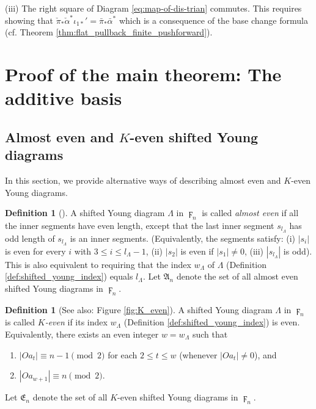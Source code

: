 \documentclass[a4paper]{amsart}
\theoremstyle{plain}
\theoremstyle{definition}
\newtheorem{definition}[theorem]{Definition}
\numberwithin{equation}{section}
\begin{document}
(iii) The right square of Diagram \ref{eq:map-of-dis-trian} commutes. This requires showing that $\check{\pi}_* \check{\alpha}^* \iota_{1*}' = \bar{\pi}_*\bar{\alpha}^*$ which is a consequence of the base change formula (cf. Theorem \ref{thm:flat_pullback_finite_pushforward}).


\section{Proof of the main theorem: The additive basis} \label{sec:proof_of_the_main_theorem}

\subsection{Almost even and \texorpdfstring{$K$}{K}-even shifted Young diagrams}
In this section, we provide alternative ways of describing almost even and $K$-even Young diagrams.
\begin{definition}[\cite{martirosian2021witt}]
    A shifted Young diagram $\Lambda$ in $\digamma_{n}$ is called \textit{almost even} if all the inner segments have even length, except that the last inner segment $s_{l_{\Lambda}}$ has odd length of $s_{l_{\Lambda}}$ is an inner segments. (Equivalently, the segments satisfy: (i) $|s_i|$ is even for every $i$ with $3 \leq i \leq l_\Lambda - 1$, (ii) $|s_2|$ is even if $|s_1| \neq 0 $, (iii) $|s_{l_\Lambda}|$ is odd). This is also equivalent to requiring that the index $w_\Lambda$ of $\Lambda$ (Definition \ref{def:shifted_young_index}) equals $l_{\Lambda}$.  Let $\mathfrak{A}_n$ denote the set of all almost even shifted Young diagrams in $\digamma_n$.
\end{definition}

\begin{definition}[See also: Figure \ref{fig:K_even}]\label{def:K_even}
    A shifted Young diagram $\Lambda$ in $\digamma_{n}$ is called \textit{$K$-even} if its index $w_\Lambda$ (Definition \ref{def:shifted_young_index}) is even. Equivalently, there exists an even integer $w=w_\Lambda$ such that
    \begin{enumerate}
        \item $|Oa_{t}| \equiv n-1 \pmod 2$ for each $2 \leq t \leq w$ (whenever $|Oa_t|\neq 0$), and
        \item $|Oa_{w+1}| \equiv n \pmod 2$.
    \end{enumerate}
    Let $\mathfrak{E}_n$ denote the set of all $K$-even shifted Young diagrams in $\digamma_n$.
\end{definition}
\end{document}
